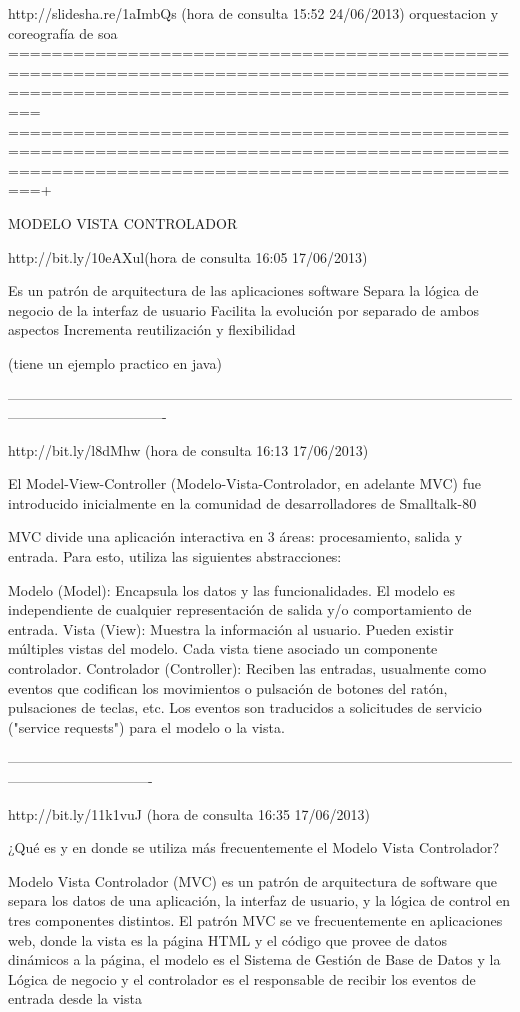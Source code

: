http://slidesha.re/1aImbQs (hora de consulta 15:52 24/06/2013) orquestacion y coreografía de soa
=============================================================================================================================================
=============================================================================================================================================+

MODELO VISTA CONTROLADOR

http://bit.ly/10eAXul(hora de consulta 16:05 17/06/2013)

Es un patrón de arquitectura de las aplicaciones software
Separa la lógica de negocio de la interfaz de usuario
Facilita la evolución por separado de ambos aspectos
Incrementa reutilización y flexibilidad

(tiene un ejemplo practico en java)

----------------------------------------------------------------------------------------------------------------------------------------------

http://bit.ly/l8dMhw (hora de consulta 16:13 17/06/2013)


El Model-View-Controller (Modelo-Vista-Controlador, en adelante MVC) fue introducido inicialmente en la comunidad de desarrolladores
de Smalltalk-80


MVC divide una aplicación interactiva en 3 áreas: procesamiento, salida y entrada. Para esto, utiliza las siguientes abstracciones:

    Modelo (Model): Encapsula los datos y las funcionalidades. El modelo es independiente de cualquier representación de salida y/o 
     comportamiento de entrada.
    Vista (View): Muestra la información al usuario. Pueden existir múltiples vistas del modelo. Cada vista tiene asociado un componente 
     controlador.
    Controlador (Controller): Reciben las entradas, usualmente como eventos que codifican los movimientos o pulsación de botones del 
     ratón, pulsaciones de teclas, etc. Los eventos son traducidos a solicitudes de servicio ("service requests") para el modelo o la vista.

-------------------------------------------------------------------------------------------------------------------------------------------


http://bit.ly/11k1vuJ (hora de consulta 16:35 17/06/2013)

¿Qué es y en donde se utiliza más frecuentemente el Modelo Vista Controlador?

Modelo Vista Controlador (MVC) es un patrón de arquitectura de software que separa los datos de una aplicación, la interfaz de usuario, 
y la lógica de control en tres componentes distintos. El patrón MVC se ve frecuentemente en aplicaciones web, donde la vista es la 
página HTML y el código que provee de datos dinámicos a la página, el modelo es el Sistema de Gestión de Base de Datos y la Lógica de 
negocio y el controlador es el responsable de recibir los eventos de entrada desde la vista

